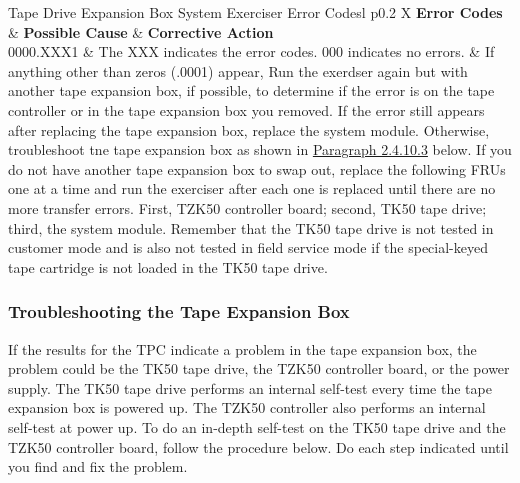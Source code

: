 \begin{tblcont}{Tape Drive Expansion Box System Exerciser Error Codes}{l p{0.2\textwidth} X}
\textbf{Error Codes} & \textbf{Possible Cause} & \textbf{Corrective Action}\\
\hline
0000.XXX1	&	The XXX indicates the error codes. 000 indicates no errors. &
	If anything other than zeros (.0001) appear, Run the exerdser again but with another tape expansion
	box, if possible, to determine if the error is on the tape controller or in the tape expansion box you
	removed. If the error still appears after replacing the tape expansion box, replace the system module.
	Otherwise, troubleshoot tne tape expansion box as shown in \hyperlink{subsubsection.2.4.10.3}{Paragraph 2.4.10.3}
	below. If you do not have another tape expansion box to swap out, replace the following FRUs one at a time and run the
	exerciser after each one is replaced until there are no more transfer errors.  First, TZK50 controller
	board; second, TK50 tape drive; third, the system module. Remember that the TK50 tape drive is not
	tested in customer mode and is also not tested in field service mode if the special-keyed tape cartridge
	is not loaded in the TK50 tape drive.
\\
\end{tblcont}

\subsubsection{Troubleshooting the Tape Expansion Box}

If the results for the TPC indicate a problem in the tape expansion box, the
problem could be the TK50 tape drive, the TZK50 controller board, or the
power supply. The TK50 tape drive performs an internal self-test every time
the tape expansion box is powered up. The TZK50 controller also performs
an internal self-test at power up. To do an in-depth self-test on the TK50
tape drive and the TZK50 controller board, follow the procedure below. Do
each step indicated until you find and fix the problem.

